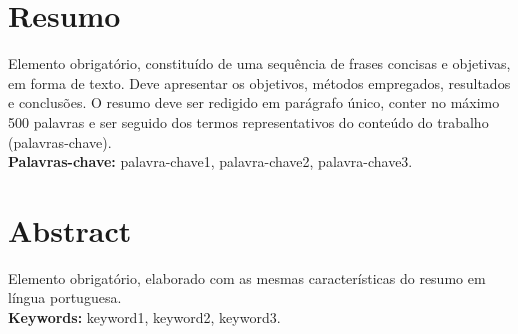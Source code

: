 \documentclass[12pt,twoside,a4paper]{book}
\begin{document}

\chapter*{Resumo}
Elemento obrigatório, constituído de uma sequência de frases concisas e
objetivas, em forma de texto.  Deve apresentar os objetivos, métodos empregados,
resultados e conclusões.  O resumo deve ser redigido em parágrafo único, conter
no máximo 500 palavras e ser seguido dos termos representativos do conteúdo do
trabalho (palavras-chave).
\\

\noindent \textbf{Palavras-chave:} palavra-chave1, palavra-chave2, palavra-chave3.

\chapter*{Abstract}

Elemento obrigatório, elaborado com as mesmas características do resumo em língua portuguesa.
\\

\noindent \textbf{Keywords:} keyword1, keyword2, keyword3.


\tableofcontents


\end{document}
